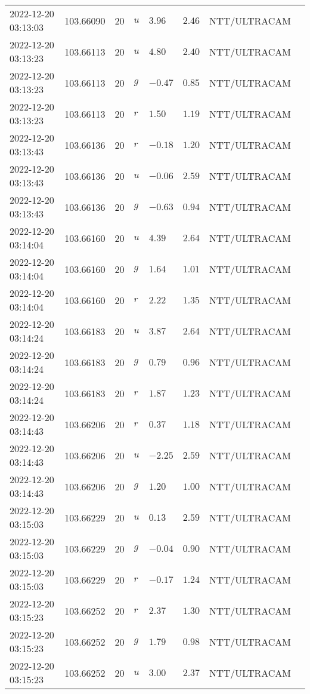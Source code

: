 \documentclass{nature_plusfigure}
\begin{document}
\begin{supplement}
\begin{center}
\begin{longtable}{llllllll}
2022-12-20 03:13:03 & 103.66090 & 20 & $u$ & $3.96$ & $2.46$ & NTT/ULTRACAM &  \\ 
2022-12-20 03:13:23 & 103.66113 & 20 & $u$ & $4.80$ & $2.40$ & NTT/ULTRACAM &  \\ 
2022-12-20 03:13:23 & 103.66113 & 20 & $g$ & $-0.47$ & $0.85$ & NTT/ULTRACAM &  \\ 
2022-12-20 03:13:23 & 103.66113 & 20 & $r$ & $1.50$ & $1.19$ & NTT/ULTRACAM &  \\ 
2022-12-20 03:13:43 & 103.66136 & 20 & $r$ & $-0.18$ & $1.20$ & NTT/ULTRACAM &  \\ 
2022-12-20 03:13:43 & 103.66136 & 20 & $u$ & $-0.06$ & $2.59$ & NTT/ULTRACAM &  \\ 
2022-12-20 03:13:43 & 103.66136 & 20 & $g$ & $-0.63$ & $0.94$ & NTT/ULTRACAM &  \\ 
2022-12-20 03:14:04 & 103.66160 & 20 & $u$ & $4.39$ & $2.64$ & NTT/ULTRACAM &  \\ 
2022-12-20 03:14:04 & 103.66160 & 20 & $g$ & $1.64$ & $1.01$ & NTT/ULTRACAM &  \\ 
2022-12-20 03:14:04 & 103.66160 & 20 & $r$ & $2.22$ & $1.35$ & NTT/ULTRACAM &  \\ 
2022-12-20 03:14:24 & 103.66183 & 20 & $u$ & $3.87$ & $2.64$ & NTT/ULTRACAM &  \\ 
2022-12-20 03:14:24 & 103.66183 & 20 & $g$ & $0.79$ & $0.96$ & NTT/ULTRACAM &  \\ 
2022-12-20 03:14:24 & 103.66183 & 20 & $r$ & $1.87$ & $1.23$ & NTT/ULTRACAM &  \\ 
2022-12-20 03:14:43 & 103.66206 & 20 & $r$ & $0.37$ & $1.18$ & NTT/ULTRACAM &  \\ 
2022-12-20 03:14:43 & 103.66206 & 20 & $u$ & $-2.25$ & $2.59$ & NTT/ULTRACAM &  \\ 
2022-12-20 03:14:43 & 103.66206 & 20 & $g$ & $1.20$ & $1.00$ & NTT/ULTRACAM &  \\ 
2022-12-20 03:15:03 & 103.66229 & 20 & $u$ & $0.13$ & $2.59$ & NTT/ULTRACAM &  \\ 
2022-12-20 03:15:03 & 103.66229 & 20 & $g$ & $-0.04$ & $0.90$ & NTT/ULTRACAM &  \\ 
2022-12-20 03:15:03 & 103.66229 & 20 & $r$ & $-0.17$ & $1.24$ & NTT/ULTRACAM &  \\ 
2022-12-20 03:15:23 & 103.66252 & 20 & $r$ & $2.37$ & $1.30$ & NTT/ULTRACAM &  \\ 
2022-12-20 03:15:23 & 103.66252 & 20 & $g$ & $1.79$ & $0.98$ & NTT/ULTRACAM &  \\ 
2022-12-20 03:15:23 & 103.66252 & 20 & $u$ & $3.00$ & $2.37$ & NTT/ULTRACAM &  \\ 

\end{longtable}
\end{center}
\end{supplement}
\end{document}
